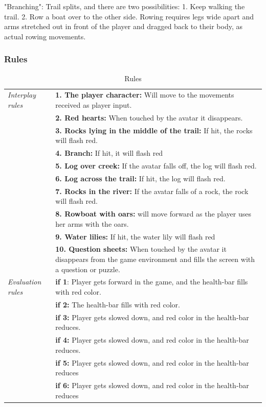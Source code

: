 "Branching": Trail splits, and there are two possibilities: 1. Keep walking the trail. 2. Row a boat over to the other side. Rowing requires legs wide apart and arms stretched out in front of the player and dragged back to their body, as actual rowing movements. 

\subsubsection{Rules} 
 
\begin{table} [H]
\centering
\begin{tabular}{|p{}|p{}|}
\hline
\emph{Interplay rules} & \textbf{1. The player character:} Will move to the movements received as player input. \\ \cline{2-2}
&  \textbf{2. Red hearts:} When touched by the avatar it disappears. \\ \cline{2-2}
& \textbf{3. Rocks lying in the middle of the trail:} If hit, the  rocks will flash red.  \\ \cline{2-2}
&  \textbf{4. Branch:} If hit, it will flash red \\ \cline{2-2}
& \textbf{5. Log over creek:} If the avatar falls off, the log will flash red. \\ \cline{2-2}
& \textbf{6. Log across the trail:} If hit, the log will flash red.  \\ \cline{2-2}
& \textbf{7. Rocks in the river:} If the avatar falls of a rock, the rock will flash red.  \\ \cline{2-2}
& \textbf{8. Rowboat with oars:} will move forward as the player  uses her arms with the oars. \\ \cline{2-2}
& \textbf{9. Water lilies:} If hit, the water lily will flash red \\ \cline{2-2}
&  \textbf{10. Question sheets:} When touched by the avatar  it  disappears from the game environment and fills the screen with  a  question or puzzle. \\ \hline
\emph{Evaluation rules} & \textbf{if 1}: Player gets forward in the game, and the health-bar fills with red color. \\ \cline{2-2}
& \textbf{if 2:} The health-bar fills with red color.  \\ \cline{2-2}
& \textbf{if 3:} Player gets slowed down, and red color in the health-bar reduces.   \\ \cline{2-2}
& \textbf{if 4:} Player gets slowed down, and red color in the health-bar reduces.  \\ \cline{2-2}
& \textbf{if 5:} Player gets slowed down, and red color in the health-bar reduces   \\ \cline{2-2}
& \textbf{if 6:} Player gets slowed down, and red color in the health-bar reduces   \\ \hline
\end{tabular}
\caption[Rules in the "Nature Trail" game]{Rules}
\label{tab:rules1}
\end{table} 

